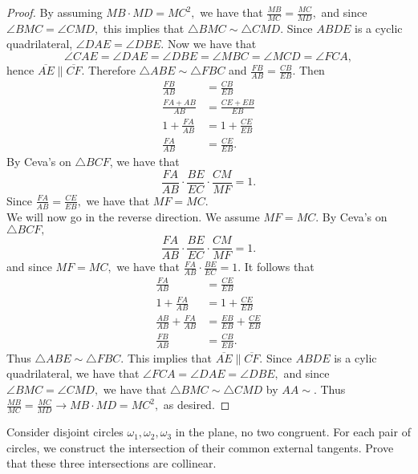 \documentclass[letterpaper,oneside]{scrartcl}
\providecommand{\ol}{\overline}
\begin{document}
\begin{proof}
  By assuming $MB\cdot  MD = MC^2,$ we have that $\frac{MB}{MC} = \frac{MC}{MD},$ and since $\angle BMC = \angle CMD,$ this implies that $\triangle BMC \sim \triangle CMD$. Since $ABDE$ is a cyclic quadrilateral, $\angle DAE = \angle DBE.$ Now we have that
  $$\angle CAE = \angle DAE = \angle DBE = \angle MBC = \angle MCD = \angle FCA,$$
  hence $\ol{AE} \parallel \ol{CF}.$ Therefore $\triangle ABE \sim \triangle FBC$ and $\frac{FB}{AB} = \frac{CB}{EB}.$ Then 
  \begin{align*}
    \frac{FB}{AB} &= \frac{CB}{EB} \\
    \frac{FA + AB}{AB} &= \frac{CE + EB}{EB} \\
    1 + \frac{FA}{AB} &= 1 + \frac{CE}{EB} \\
    \frac{FA}{AB}&=\frac{CE}{EB}.
  \end{align*}
  By Ceva's on $\triangle BCF$, we have that
  $$\frac{FA}{AB}\cdot\frac{BE}{EC}\cdot\frac{CM}{MF} = 1.$$
  Since $\frac{FA}{AB}=\frac{CE}{EB},$ we have that $MF = MC.$ \\

  We will now go in the reverse direction. We assume $MF = MC.$ By Ceva's on $\triangle BCF,$ 
  $$\frac{FA}{AB}\cdot\frac{BE}{EC}\cdot\frac{CM}{MF} = 1.$$
  and since $MF = MC,$ we have that $\frac{FA}{AB}\cdot\frac{BE}{EC} = 1.$ It follows that
  \begin{align*}
    \frac{FA}{AB} &= \frac{CE}{EB} \\
    1 + \frac{FA}{AB} &= 1 + \frac{CE}{EB}\\
    \frac{AB}{AB} + \frac{FA}{AB} &= \frac{EB}{EB} + \frac{CE}{EB} \\
    \frac{FB}{AB} &= \frac{CB}{EB}. 
  \end{align*}
  Thus $\triangle ABE \sim \triangle FBC.$ This implies that $\ol{AE} \parallel \ol{CF}.$  Since $ABDE$ is a cylic quadrilateral, we have that $\angle FCA = \angle DAE = \angle DBE,$ and since $\angle BMC = \angle CMD,$ we have that $\triangle BMC \sim \triangle CMD$ by $AA\sim.$ Thus $\frac{MB}{MC} = \frac{MC}{MD} \rightarrow MB\cdot MD = MC^2,$ as desired. 
\end{proof}

\begin{theorem*}
  Consider disjoint circles $\omega_1, \omega_2, \omega_3$ in the plane, no two congruent. For each pair of circles, we construct the intersection of their common external tangents. Prove that these three intersections are collinear. 
\end{theorem*}
\end{document}
